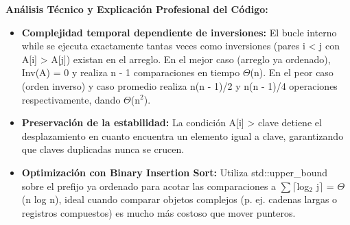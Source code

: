 \documentclass[11pt,letterpaper]{article}
\begin{document}
\noindent\textbf{\color{ipnguinda}Análisis Técnico y Explicación Profesional del Código:}\par\vspace{-2pt}
\begin{itemize}
\setlength{\itemsep}{2pt}\setlength{\parskip}{0pt}
  \item \textbf{Complejidad temporal dependiente de inversiones: }El bucle interno while se ejecuta exactamente tantas veces como inversiones (pares i < j con A[i] > A[j]) existan en el arreglo. En el mejor caso (arreglo ya ordenado), Inv(A) = 0 y realiza n - 1 comparaciones en tiempo $\Theta$(n). En el peor caso (orden inverso) y caso promedio realiza n(n - 1)/2 y n(n - 1)/4 operaciones respectivamente, dando $\Theta$(n$^2$).
  \item \textbf{Preservación de la estabilidad: }La condición A[i] > clave detiene el desplazamiento en cuanto encuentra un elemento igual a clave, garantizando que claves duplicadas nunca se crucen.
  \item \textbf{Optimización con Binary Insertion Sort: }Utiliza std::upper\_bound sobre el prefijo ya ordenado para acotar las comparaciones a $\sum$$\lceil$log$_2$ j$\rceil$ = $\Theta$(n log n), ideal cuando comparar objetos complejos (p. ej. cadenas largas o registros compuestos) es mucho más costoso que mover punteros.
\end{itemize}
\end{document}
